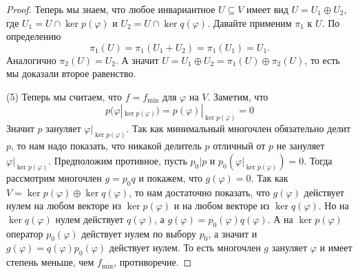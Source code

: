 \begin{proof}
Теперь мы знаем, что любое инвариантное $U\subseteq V$ имеет вид $U = U_1 \oplus U_2$, где $U_1 = U\cap \ker p(\varphi)$ и $U_2 = U\cap \ker q(\varphi)$. Давайте применим $\pi_1$ к $U$. По определению 
\[
\pi_1(U) = \pi_1(U_1 + U_2) = \pi_1(U_1) = U_1.
\]
Аналогично $\pi_2 (U) = U_2$. А значит $U = U_1\oplus U_2 = \pi_1(U) \oplus \pi_2(U)$, то есть мы доказали второе равенство.


(5) Теперь мы считаем, что $f = f_\text{min}$ для $\varphi$ на $V$. Заметим, что
\[
p(\varphi|_{\ker p(\varphi)}) = p(\varphi)|_{\ker p(\varphi)} = 0
\]
Значит $p$ зануляет $\varphi|_{\ker p(\varphi)}$. Так как минимальный многочлен обязательно делит $p$, то нам надо показать, что никакой делитель $p$ отличный от $p$ не зануляет $\varphi|_{\ker p(\varphi)}$. Предположим противное, пусть $p_0 | p$ и $p_0(\varphi|_{\ker p(\varphi)}) = 0$. Тогда рассмотрим многочлен $g = p_0 q$ и покажем, что $g(\varphi) = 0$. Так как $V = \ker p(\varphi) \oplus \ker q(\varphi)$, то нам достаточно показать, что  $g(\varphi)$ действует нулем на любом векторе из $\ker p(\varphi)$ и на любом векторе из $\ker q(\varphi)$. Но на $\ker q(\varphi)$ нулем действует $q(\varphi)$, а $g(\varphi) = p_0(\varphi)q(\varphi)$. А на $\ker p(\varphi)$ оператор $p_0(\varphi)$ действует нулем по выбору $p_0$, а значит и $g(\varphi) = q(\varphi) p_0(\varphi)$ действует нулем. То есть многочлен $g$ зануляет $\varphi$ и имеет степень меньше, чем $f_\text{min}$, противоречие.

\end{proof}

